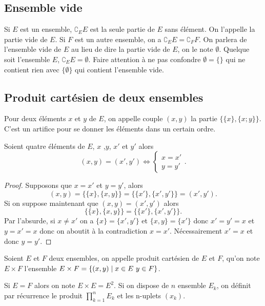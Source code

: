 \subsection{Ensemble vide}
\label{chap3-subsec:ensemblevide}
Si \(E\) est un ensemble, \(\complement_E E\) est la seule partie de \(E\) sans 
élément. On l'appelle la partie vide de \(E\). Si \(F\) est un autre ensemble, 
on a \(\complement_E E = \complement_F F\). On parlera de l'ensemble vide de 
\(E\) au lieu de dire la partie vide de \(E\), on le note \(\emptyset\). Quelque 
soit l'ensemble \(E\), \(\complement_E E =\emptyset\).
Faire attention à ne pas confondre \(\emptyset = \{\}\) qui ne contient rien 
avec \(\{\emptyset\}\) qui contient l'ensemble vide.
\subsection{Produit cartésien de deux ensembles}
\label{chap3-subsec:prodcart}
\begin{defdef}
    Pour deux éléments \(x\) et \(y\) de \(E\), on appelle couple \((x,y)\) la 
    partie \(\{\{x\},\{x;y\}\}\). C'est un artifice pour se donner les éléments dans 
    un certain ordre.
\end{defdef}
\begin{prop}
    Soient quatre éléments de \(E\), \(x\) ,\(y\), \(x'\) et \(y'\) alors 
    \begin{equation} 
        (x,y)=(x',y') \iff \begin{cases} x=x' \\ y=y' \end{cases}.
    \end{equation}
\end{prop}
\begin{proof}
    Supposons que \(x=x'\) et \(y=y'\), alors 
    \begin{equation}
        (x,y)=\{\{x\},\{x,y\}\}=\{\{x'\},\{x',y'\}\}=(x',y').
    \end{equation}
    Si on suppose maintenant que \((x,y)=(x',y')\) alors 
    \begin{equation}
        \{\{x\},\{x,y\}\}=\{\{x'\},\{x',y'\}\}.
    \end{equation}
    Par l'absurde, si \(x \neq x'\) on a \(\{x\}=\{x',y'\}\) et \(\{x,y\} = \{x'\}\) 
    donc \(x'=y'=x\) et \(y=x'=x\) donc on aboutit à la contradiction \(x=x'\). 
    Nécessairement \(x'=x\) et donc \(y=y'\).
\end{proof}
\begin{defdef}
    Soient \(E\) et \(F\) deux ensembles, on appelle produit cartésien de \(E\) et 
    \(F\), qu'on note \(E \times F\) l'ensemble $E \times F = \left\{(x,y)\mathrel{}\middle|\mathrel{}x \in E 
    \ y \in F\right\}$.
\end{defdef}
Si \(E=F\) alors on note \(E \times E=E^2\). Si on dispose de \(n\) ensemble 
\(E_k\), on définit par récurrence le produit \(\prod_{k=1}^n E_k\) et les 
n-uplets \((x_k)\).

